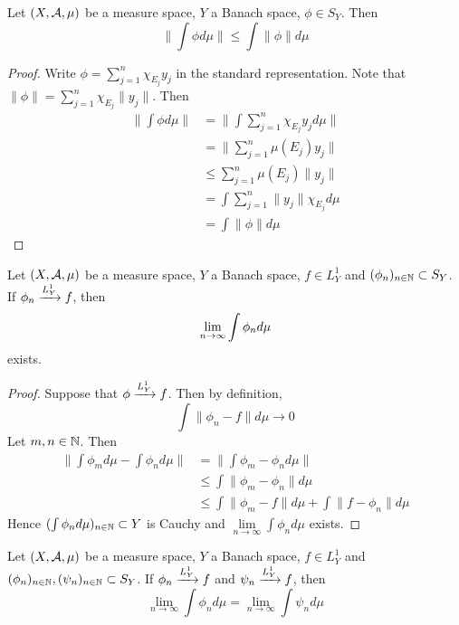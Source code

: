 \documentclass{book}
\begin{document}
	\begin{ex}  
	Let $(X, \mathcal{A}, \mu)$ be a measure space, $Y$ a Banach space, $\phi \in S_Y$. Then $$\bigg \| \int \phi d\mu   \bigg \|  \leq \int \|\phi \| d \mu$$
	\end{ex}
	
	\begin{proof}
	Write $\phi = \sum\limits_{j=1}^n\chi_{E_j}y_j$ in the standard representation. Note that $\|\phi \| = \sum\limits_{j=1}^n\chi_{E_j} \|y_j\|$. Then 
	\begin{align*}
	\bigg \|  \int \phi d\mu  \bigg \| 
	&=  \bigg \|  \int \sum\limits_{j=1}^n\chi_{E_j}y_j  d\mu  \bigg \| \\
	&= \bigg \| \sum\limits_{j=1}^n \mu(E_j)y_j \bigg \| \\
	& \leq \sum\limits_{j=1}^n \mu(E_j) \|y_j \| \\
	&= \int \sum\limits_{j=1}^n \|y_j \| \chi_{E_j} d \mu \\
	&= \int \|\phi \| d\mu
	\end{align*}
	\end{proof}
	
	\begin{ex}  
	Let $(X, \mathcal{A}, \mu)$ be a measure space, $Y$ a Banach space, $f \in L^1_Y$ and $(\phi_n)_{n \in \mathbb{N}} \subset S_Y$. If $\phi_n \xrightarrow{L^1_Y} f$, then $$\lim \limits_{n \rightarrow \infty} \int \phi_n d\mu $$ exists.
	\end{ex}
	
	\begin{proof}
	Suppose that $\phi \xrightarrow{L^1_Y} f$. Then by definition, $$\int \|\phi_n -f\| d\mu \rightarrow 0$$ Let $m,n \in \mathbb{N}$. Then 
	\begin{align*}
	\bigg \|\int \phi_m d\mu - \int \phi_n d\mu \bigg \| 
	&= \bigg \| \int \phi_m  - \phi_n d\mu  \bigg \| \\
	& \leq  \int \|\phi_m  - \phi_n\| d \mu \\
	& \leq \int \|\phi_m  - f \| d \mu + \int \|f  - \phi_n\| d \mu
	\end{align*}
	Hence $( \int \phi_n  d \mu)_{n \in \mathbb{N}} \subset Y$ is Cauchy and $\lim\limits_{n \rightarrow \infty} \int \phi_n d\mu$ exists.
\end{proof}		

	\begin{ex}  
	Let $(X, \mathcal{A}, \mu)$ be a measure space, $Y$ a Banach space, $f \in L^1_Y$ and $(\phi_n)_{n \in \mathbb{N}}, (\psi_n)_{n \in \mathbb{N}} \subset S_Y$. If $\phi_n \xrightarrow{L^1_Y} f$ and $\psi_n \xrightarrow{L^1_Y} f$, then $$\lim\limits_{n \rightarrow \infty} \int \phi_n d\mu = \lim\limits_{n \rightarrow \infty} \int \psi_n d\mu$$
	\end{ex}
	
\end{document}
